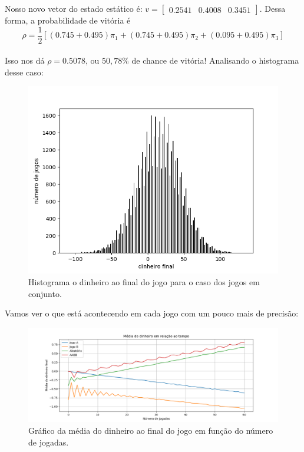 \documentclass[12pt]{article}
\begin{document}
Nosso novo vetor do estado estático é: $v = \begin{bmatrix} 0.2541 & 0.4008 & 0.3451 \end{bmatrix}$. Dessa forma, a probabilidade de vitória é\\
$$
\rho = \frac{1}{2}[(0.745 + 0.495)\pi_1 + (0.745 + 0.495)\pi_2 + (0.095 + 0.495)\pi_3]
$$\\
Isso nos dá $\rho = 0.5078$, ou $50,78\%$ de chance de vitória! Analisando o histograma desse caso:


\begin{figure}[H]
\centering
\includegraphics[scale=0.65]{graph11.png}
\caption{Histograma o dinheiro ao final do jogo para o caso dos jogos em conjunto.}
\end{figure}

Vamos ver o que está acontecendo em cada jogo com um pouco mais de precisão:


\begin{figure}[H]
\centering
\includegraphics[scale=0.5]{graph12.png}
\caption{Gráfico da média do dinheiro ao final do jogo em função do número de jogadas.}
\end{figure}
\end{document}

